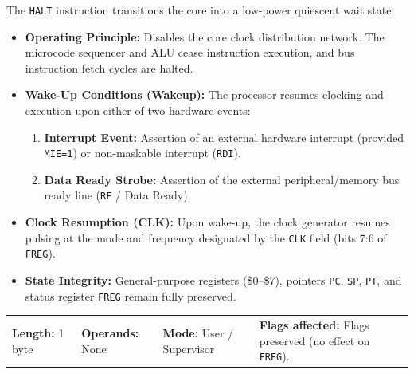 \documentclass[11pt,a4paper]{article}
\newcommand{\reg}{\$}
\begin{document}
\begin{instructiondesc}[title={Detailed Description and Microcode Semantics},top=2.5pt,bottom=2.5pt]
The \texttt{HALT} instruction transitions the core into a low-power quiescent wait state:
\begin{itemize}[leftmargin=10pt,itemsep=0.5pt,topsep=1pt,parsep=0pt]
    \item \textbf{Operating Principle:} Disables the core clock distribution network. The microcode sequencer and ALU cease instruction execution, and bus instruction fetch cycles are halted.
    \item \textbf{Wake-Up Conditions (Wakeup):} The processor resumes clocking and execution upon either of two hardware events:
    \begin{enumerate}[leftmargin=12pt,itemsep=0.5pt,topsep=0.5pt,parsep=0pt]
        \item \textbf{Interrupt Event:} Assertion of an external hardware interrupt (provided \texttt{MIE=1}) or non-maskable interrupt (\texttt{RDI}).
        \item \textbf{Data Ready Strobe:} Assertion of the external peripheral/memory bus ready line (\texttt{RF} / Data Ready).
    \end{enumerate}
    \item \textbf{Clock Resumption (CLK):} Upon wake-up, the clock generator resumes pulsing at the mode and frequency designated by the \texttt{CLK} field (bits 7:6 of \texttt{FREG}).
    \item \textbf{State Integrity:} General-purpose registers (\reg0--\reg7), pointers \texttt{PC}, \texttt{SP}, \texttt{PT}, and status register \texttt{FREG} remain fully preserved.
\end{itemize}
\end{instructiondesc}

\begin{tcolorbox}[
    enhanced,
    colback=limcard,
    colframe=limborder,
    boxrule=0.6pt,
    arc=3pt,
    left=8pt,right=8pt,top=2.5pt,bottom=2.5pt
]
    \footnotesize
    \noindent
    \begin{tabularx}{\textwidth}{@{}l l l X@{}}
        \textbf{Length:} 1 byte &
        \textbf{Operands:} None &
        \textbf{Mode:} User / Supervisor &
        \textbf{Flags affected:} Flags preserved (no effect on \texttt{FREG}).
    \end{tabularx}
\end{tcolorbox}
\end{document}
